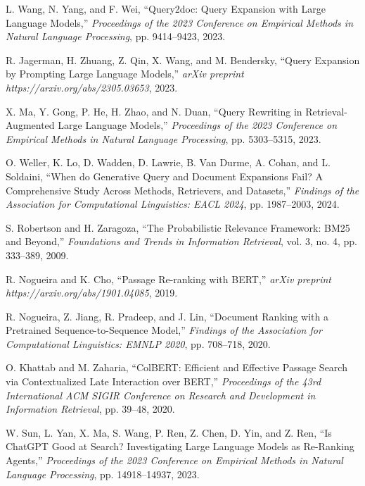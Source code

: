 L. Wang, N. Yang, and F. Wei,
``Query2doc: Query Expansion with Large Language Models,''
\textit{Proceedings of the 2023 Conference on Empirical Methods in Natural
Language Processing},
pp. 9414--9423, 2023.

R. Jagerman, H. Zhuang, Z. Qin, X. Wang, and M. Bendersky,
``Query Expansion by Prompting Large Language Models,''
\textit{arXiv preprint https://arxiv.org/abs/2305.03653}, 2023.

X. Ma, Y. Gong, P. He, H. Zhao, and N. Duan,
``Query Rewriting in Retrieval-Augmented Large Language Models,''
\textit{Proceedings of the 2023 Conference on Empirical Methods in Natural
Language Processing},
pp. 5303--5315, 2023.

O. Weller, K. Lo, D. Wadden, D. Lawrie, B. Van Durme, A. Cohan, and L. Soldaini,
``When do Generative Query and Document Expansions Fail? A Comprehensive Study
Across Methods, Retrievers, and Datasets,''
\textit{Findings of the Association for Computational Linguistics: EACL 2024},
pp. 1987--2003, 2024.

S. Robertson and H. Zaragoza,
``The Probabilistic Relevance Framework: BM25 and Beyond,''
\textit{Foundations and Trends in Information Retrieval},
vol. 3, no. 4, pp. 333--389, 2009.

R. Nogueira and K. Cho,
``Passage Re-ranking with BERT,''
\textit{arXiv preprint https://arxiv.org/abs/1901.04085}, 2019.

R. Nogueira, Z. Jiang, R. Pradeep, and J. Lin,
``Document Ranking with a Pretrained Sequence-to-Sequence Model,''
\textit{Findings of the Association for Computational Linguistics: EMNLP 2020},
pp. 708--718, 2020.

O. Khattab and M. Zaharia,
``ColBERT: Efficient and Effective Passage Search via Contextualized Late
Interaction over BERT,''
\textit{Proceedings of the 43rd International ACM SIGIR Conference on Research
and Development in Information Retrieval},
pp. 39--48, 2020.

W. Sun, L. Yan, X. Ma, S. Wang, P. Ren, Z. Chen, D. Yin, and Z. Ren,
``Is ChatGPT Good at Search? Investigating Large Language Models as Re-Ranking
Agents,''
\textit{Proceedings of the 2023 Conference on Empirical Methods in Natural
Language Processing},
pp. 14918--14937, 2023.

